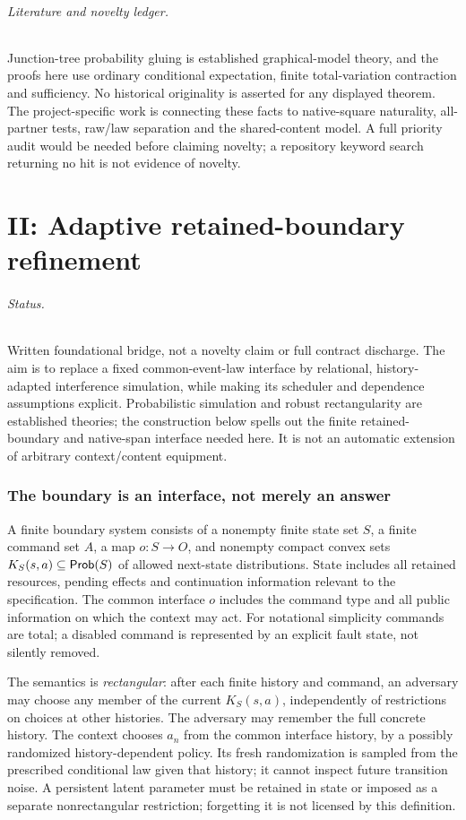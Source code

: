 \documentclass[11pt]{article}
\begin{document}
\paragraph{Literature and novelty ledger.} Junction-tree probability gluing is established graphical-model theory, and the proofs here use ordinary conditional expectation, finite total-variation contraction and sufficiency. No historical originality is asserted for any displayed theorem. The project-specific work is connecting these facts to native-square naturality, all-partner tests, raw/law separation and the shared-content model. A full priority audit would be needed before claiming novelty; a repository keyword search returning no hit is not evidence of novelty.

\part{II: Adaptive retained-boundary refinement}

\paragraph{Status.} Written foundational bridge, not a novelty claim or full contract discharge. The aim is to replace a fixed common-event-law interface by relational, history-adapted interference simulation, while making its scheduler and dependence assumptions explicit. Probabilistic simulation and robust rectangularity are established theories; the construction below spells out the finite retained-boundary and native-span interface needed here. It is not an automatic extension of arbitrary context/content equipment.

\section{The boundary is an interface, not merely an answer}
A finite boundary system consists of a nonempty finite state set $S$, a finite command set $A$, a map $o:S\to O$, and nonempty compact convex sets $K_S(s,a)\subseteq\mathsf{Prob}(S)$ of allowed next-state distributions. State includes all retained resources, pending effects and continuation information relevant to the specification. The common interface $o$ includes the command type and all public information on which the context may act. For notational simplicity commands are total; a disabled command is represented by an explicit fault state, not silently removed.

The semantics is \emph{rectangular}: after each finite history and command, an adversary may choose any member of the current $K_S(s,a)$, independently of restrictions on choices at other histories. The adversary may remember the full concrete history. The context chooses $a_n$ from the common interface history, by a possibly randomized history-dependent policy. Its fresh randomization is sampled from the prescribed conditional law given that history; it cannot inspect future transition noise. A persistent latent parameter must be retained in state or imposed as a separate nonrectangular restriction; forgetting it is not licensed by this definition.
\end{document}
